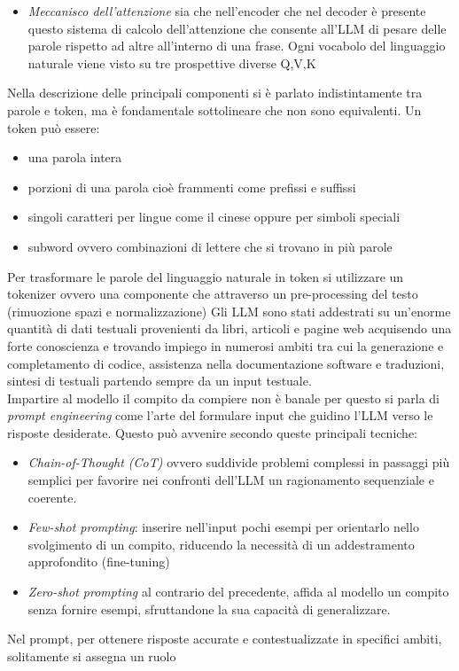\documentclass{article}
\begin{document}
\begin{itemize}
\begin{itemize}
    \item \textit{Meccanisco dell'attenzione} sia che nell'encoder che nel decoder è presente questo sistema di calcolo dell'attenzione che consente all'LLM di pesare delle parole rispetto ad altre all'interno di una frase. Ogni vocabolo del linguaggio naturale viene visto su tre prospettive diverse Q,V,K \cite{vaswani2017attention}
\end{itemize}
Nella descrizione delle principali componenti si è parlato indistintamente tra parole e token, ma è fondamentale sottolineare che non sono equivalenti. Un token può essere:
\begin{itemize}
    \item una parola intera
    \item porzioni di una parola cioè frammenti come prefissi e suffissi 
    \item singoli caratteri per lingue come il cinese oppure per simboli speciali
    \item subword ovvero combinazioni di lettere che si trovano in più parole
\end{itemize}
Per trasformare le parole del linguaggio naturale in token si utilizzare un tokenizer ovvero una componente che attraverso un pre-processing del testo (rimuozione spazi e normalizzazione) 
Gli LLM sono stati addestrati su un'enorme quantità di dati testuali provenienti da libri, articoli e pagine web acquisendo una forte conoscienza e trovando impiego in numerosi ambiti tra cui la generazione e completamento di codice, assistenza nella documentazione software e traduzioni, sintesi di testuali partendo sempre da un input testuale.\\
Impartire al modello il compito da compiere non è banale per questo si parla di \textit{prompt engineering} come l'arte del formulare input che guidino l'LLM verso le risposte desiderate. Questo può avvenire secondo queste principali tecniche:
\begin{itemize}
    \item \textit{Chain-of-Thought (CoT)} ovvero suddivide problemi complessi in passaggi più semplici per favorire nei confronti dell'LLM un ragionamento sequenziale e coerente.
    \item \textit{Few-shot prompting}: inserire nell'input pochi esempi per orientarlo nello svolgimento di un compito, riducendo la necessità di un addestramento approfondito (fine-tuning)
    \item \textit{Zero-shot prompting} al contrario del precedente, affida al modello un compito senza fornire esempi, sfruttandone la sua capacità di generalizzare.
\end{itemize}
Nel prompt, per ottenere risposte accurate e contestualizzate in specifici ambiti, solitamente si assegna un ruolo 


\end{itemize}
\end{document}
